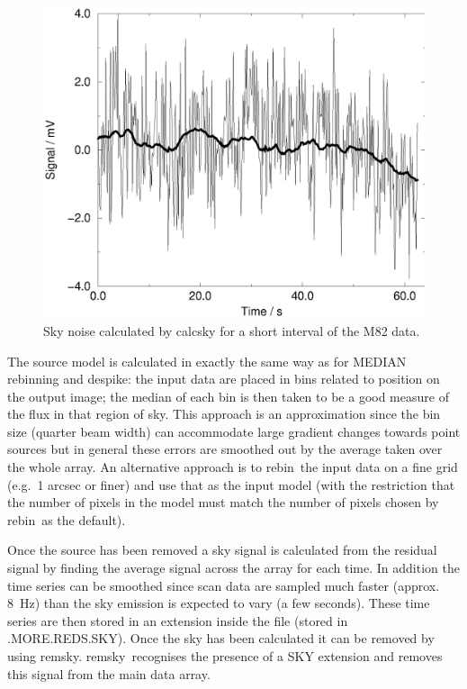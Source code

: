 \documentclass[twoside,11pt]{article}
\newcommand{\task}[1]{{\sf #1}}
\newcommand{\rebin}{\htmlref{\task{rebin}}{REBIN}}
\newcommand{\remsky}{\htmlref{\task{remsky}}{REMSKY}}
\newcommand{\despike}{\htmlref{\task{despike}}{DESPIKE}}
\newcommand{\htmlref}[2]{#1}
\renewcommand{\_}{\texttt{\symbol{95}}}
\begin{document}
\begin{figure}
\begin{center}
\includegraphics[width=5.0in]{sun216_scansky.eps}
\caption{Sky noise calculated by \task{calcsky} for a short interval
of the M82 data.}
\label{fig:scansky}
\end{center}
\end{figure}


The source model is calculated in exactly the same way as for MEDIAN rebinning
and \despike: the input data are placed in bins related to position on the
output image; the median of each bin is then taken to be a good measure of the
flux in that region of sky. This approach is an approximation since the bin
size (quarter beam width) can accommodate large gradient changes towards
point sources but in general these errors are smoothed out by the average
taken over the whole array. An alternative approach is to \rebin\ the input
data on a fine grid (e.g.\ 1 arcsec or finer) and use that as the input model
(with the restriction that the number of pixels in the model must match the
number of pixels chosen by \rebin\ as the default).

Once the source has been removed a sky signal is calculated from the residual
signal by finding the average signal across the array for each time. 
In addition the time series can be smoothed since scan data are sampled
much faster (approx. 8~Hz) than the sky emission is expected to vary
(a few seconds). These
time series are then stored in an extension inside the file (stored in
.MORE.REDS.SKY).  Once the sky has been calculated it can be removed by using
\remsky. \remsky\ recognises the presence of a SKY extension and removes this
signal from the main data array.
\end{document}
